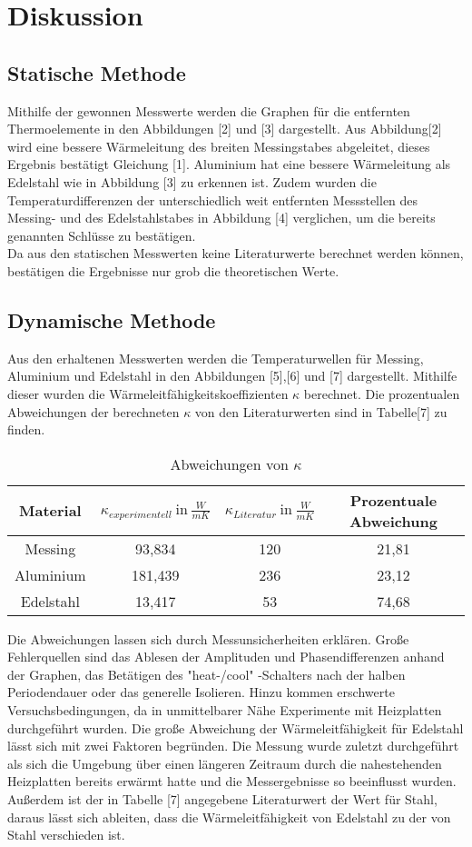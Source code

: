 \section{Diskussion}
\label{sec:Diskussion}
\subsection{Statische Methode}
Mithilfe der gewonnen Messwerte werden die Graphen für die entfernten Thermoelemente in den Abbildungen
[2] und [3] dargestellt. Aus Abbildung[2] wird eine bessere Wärmeleitung des breiten Messingstabes abgeleitet, dieses Ergebnis bestätigt Gleichung [1].
Aluminium hat eine bessere Wärmeleitung als Edelstahl wie in Abbildung [3] zu erkennen ist.
Zudem wurden die Temperaturdifferenzen der unterschiedlich weit entfernten Messstellen des Messing- und des Edelstahlstabes in Abbildung [4] verglichen, um die bereits genannten Schlüsse zu bestätigen.\\
Da aus den statischen Messwerten keine Literaturwerte berechnet werden können, bestätigen die Ergebnisse nur grob die theoretischen Werte.
\subsection{Dynamische Methode}
Aus den erhaltenen Messwerten werden die Temperaturwellen für Messing, Aluminium und Edelstahl in den Abbildungen [5],[6] und [7]
dargestellt. Mithilfe dieser wurden die Wärmeleitfähigkeitskoeffizienten $\kappa$ berechnet.
Die prozentualen Abweichungen der berechneten $\kappa$ von den Literaturwerten sind in Tabelle[7] zu finden.
\begin{table}[H]
    \centering
    \caption{Abweichungen von $\kappa$}
    \label{tab:7}
    \begin{tabular}{c c c c}
      \toprule
     Material & $\kappa_{experimentell} \ \text{in} \ \frac{W}{mK} $ & $ \kappa_{Literatur} \ \text{in} \ \frac{W}{mK} $ &  Prozentuale Abweichung \\
      \midrule
      Messing & 93,834 &  120 & 21,81 \\
      Aluminium & 181,439 & 236 & 23,12 \\
      Edelstahl & 13,417 & 53 & 74,68 \\
      \bottomrule
    \end{tabular}
\end{table}
Die Abweichungen lassen sich durch Messunsicherheiten erklären.
Große Fehlerquellen sind das Ablesen der Amplituden und Phasendifferenzen anhand der Graphen, das Betätigen des "heat-/cool" -Schalters nach der halben Periodendauer oder das generelle Isolieren.
Hinzu kommen erschwerte Versuchsbedingungen, da in unmittelbarer Nähe Experimente mit Heizplatten durchgeführt wurden.
Die große Abweichung der Wärmeleitfähigkeit für Edelstahl lässt sich mit zwei Faktoren begründen.
Die Messung wurde zuletzt durchgeführt als sich die Umgebung über einen längeren Zeitraum durch die nahestehenden Heizplatten bereits erwärmt hatte und die Messergebnisse so beeinflusst wurden.
Außerdem ist der in Tabelle [7] angegebene Literaturwert der Wert für Stahl, daraus lässt sich ableiten, dass die Wärmeleitfähigkeit von Edelstahl zu der von Stahl verschieden ist.
